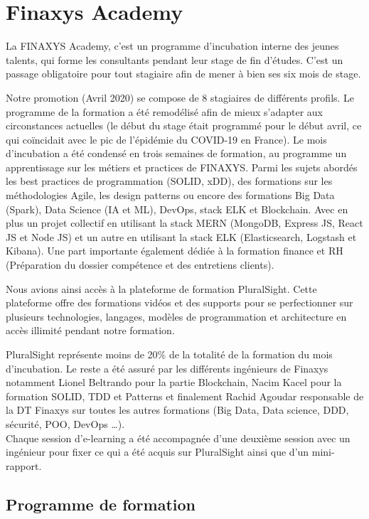 \section{Finaxys Academy} 
\par La FINAXYS Academy, c’est un programme d'incubation interne des jeunes talents, qui forme les consultants pendant leur stage de fin d’études. C'est un passage obligatoire pour tout stagiaire afin de mener à bien ses six mois de stage. 
\par Notre promotion (Avril 2020) se compose de 8 stagiaires de différents profils. Le programme de la formation a été remodélisé afin de mieux s'adapter aux circonstances actuelles (le début du stage était programmé pour le début avril, ce qui coïncidait avec le pic de l'épidémie du COVID-19 en France). Le mois d'incubation a été condensé en trois semaines de formation, au programme un apprentissage sur les métiers et practices de FINAXYS. Parmi les sujets abordés les best practices de programmation (SOLID, xDD), des formations sur les méthodologies Agile, les design patterns ou encore des formations Big Data (Spark), Data Science (IA et ML), DevOps, stack ELK  et Blockchain. Avec en plus un projet collectif en utilisant la stack MERN (MongoDB, Express JS, React JS et Node JS) et un autre en utilisant la stack ELK (Elasticsearch, Logstash et Kibana). Une part importante également dédiée à la formation finance et RH (Préparation du dossier compétence et des entretiens clients). 
\par Nous avions ainsi accès à la plateforme de formation PluralSight. Cette plateforme offre des formations vidéos et des supports pour se perfectionner sur plusieurs technologies, langages, modèles de programmation et architecture en accès illimité pendant notre formation.
\par PluralSight représente moins de 20\% de la totalité de la formation du mois d'incubation. Le reste a été assuré par les différents ingénieurs de Finaxys notamment Lionel Beltrando pour la partie Blockchain, Nacim Kacel pour la formation SOLID, TDD et Patterns et finalement Rachid Agoudar responsable de la DT Finaxys sur toutes les autres formations (Big Data, Data science, DDD, sécurité, POO, DevOps \dots).  \\
Chaque session d'e-learning a été accompagnée d'une deuxième session avec un ingénieur pour fixer ce qui a été acquis sur PluralSight ainsi que d'un mini-rapport.

\subsection{Programme de formation}


